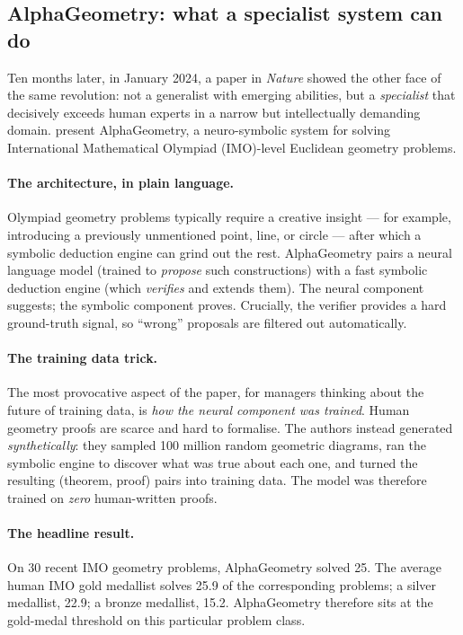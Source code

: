 \documentclass[11pt,a4paper]{article}
\begin{document}
\subsection{AlphaGeometry: what a specialist system can do}

Ten months later, in January 2024, a paper in \emph{Nature} showed the
other face of the same revolution: not a generalist with emerging
abilities, but a \emph{specialist} that decisively exceeds human
experts in a narrow but intellectually demanding domain.
\citet{trinh2024alphageometry} present AlphaGeometry, a neuro-symbolic
system for solving International Mathematical Olympiad (IMO)-level
Euclidean geometry problems.

\paragraph{The architecture, in plain language.} Olympiad geometry
problems typically require a creative insight --- for example,
introducing a previously unmentioned point, line, or circle --- after
which a symbolic deduction engine can grind out the rest. AlphaGeometry
pairs a neural language model (trained to \emph{propose} such
constructions) with a fast symbolic deduction engine (which
\emph{verifies} and extends them). The neural component suggests; the
symbolic component proves. Crucially, the verifier provides a hard
ground-truth signal, so ``wrong'' proposals are filtered out
automatically.

\paragraph{The training data trick.} The most provocative aspect of
the paper, for managers thinking about the future of training data, is
\emph{how the neural component was trained}. Human geometry proofs are
scarce and hard to formalise. The authors instead generated
\emph{synthetically}: they sampled 100 million random geometric
diagrams, ran the symbolic engine to discover what was true about each
one, and turned the resulting (theorem, proof) pairs into training
data. The model was therefore trained on \emph{zero} human-written
proofs.

\paragraph{The headline result.} On 30 recent IMO geometry problems,
AlphaGeometry solved 25. The average human IMO gold medallist solves
25.9 of the corresponding problems; a silver medallist, 22.9; a bronze
medallist, 15.2. AlphaGeometry therefore sits at the gold-medal
threshold on this particular problem class.
\end{document}

